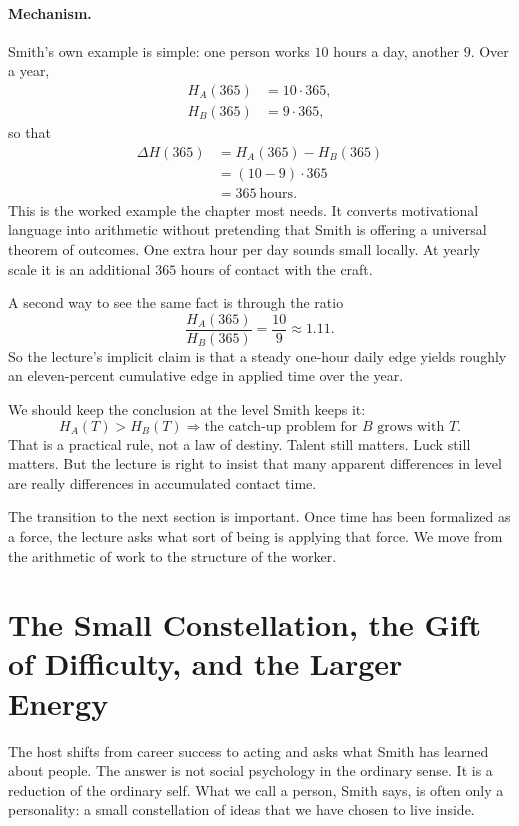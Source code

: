 \paragraph{Mechanism.}
Smith's own example is simple: one person works \(10\) hours a day, another \(9\). Over a year,
\begin{align}
H_A(365)&=10\cdot 365,\\
H_B(365)&=9\cdot 365,
\end{align}
so that
\begin{align}
\Delta H(365)
&=H_A(365)-H_B(365)\\
&=(10-9)\cdot 365\\
&=365\ \text{hours}.
\end{align}
This is the worked example the chapter most needs. It converts motivational language into arithmetic without pretending that Smith is offering a universal theorem of outcomes. One extra hour per day sounds small locally. At yearly scale it is an additional \(365\) hours of contact with the craft.

A second way to see the same fact is through the ratio
\begin{equation}
\frac{H_A(365)}{H_B(365)}=\frac{10}{9}\approx 1.11.
\end{equation}
So the lecture's implicit claim is that a steady one-hour daily edge yields roughly an eleven-percent cumulative edge in applied time over the year.

We should keep the conclusion at the level Smith keeps it:
\begin{equation}
H_A(T)>H_B(T)
\Longrightarrow
\text{the catch-up problem for }B\text{ grows with }T.
\end{equation}
That is a practical rule, not a law of destiny. Talent still matters. Luck still matters. But the lecture is right to insist that many apparent differences in level are really differences in accumulated contact time.

The transition to the next section is important. Once time has been formalized as a force, the lecture asks what sort of being is applying that force. We move from the arithmetic of work to the structure of the worker.

\section{The Small Constellation, the Gift of Difficulty, and the Larger Energy}

The host shifts from career success to acting and asks what Smith has learned about people. The answer is not social psychology in the ordinary sense. It is a reduction of the ordinary self. What we call a person, Smith says, is often only a personality: a small constellation of ideas that we have chosen to live inside.

